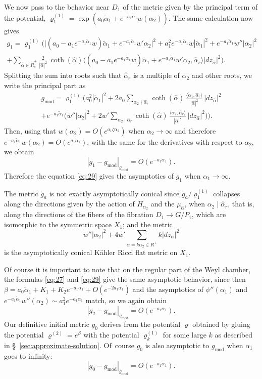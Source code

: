 \documentclass[10pt]{amsart}
\theoremstyle{plain}
\theoremstyle{definition}
\DeclareMathOperator{\mo}{mod}
\newcommand{\ta}{\tilde \alpha}
\newcommand{\ha}{\hat{\alpha}}
\newcommand{\Roots}{\hat{R}}
\newcommand{\rhodeux}{\varrho^{(2)}}
\newcommand{\rhoun}{\varrho^{(1)}}
\begin{document}
We now pass to the behavior near $D_1$ of the metric given by the principal term of the potential, $\rhoun_1=\exp(a_0\ta_1+e^{-a_1\ta_1} w(\alpha_2))$. The same calculation now gives
\begin{multline*}
g_1 = \rhoun_1 \Big( \big|(a_0-a_1e^{-a_1\ta_1}w)\ta_1+e^{-a_1\ta_1} w'\alpha_2\big|^2  + a_1^2e^{-a_1\ta_1} w |\ta_1|^2 + e^{-a_1\ta_1}w'' |\alpha_2|^2 \\
 + \sum_{\ha\in \Roots_s^+} \frac2{|\ha|^2}\, \coth(\ha) \big\langle(a_0-a_1e^{-a_1\ta_1}w)\ta_1+e^{-a_1\ta_1}w'\alpha_2,\ha_r\big\rangle |dz_{\ha}|^2 \Big).
\end{multline*}
Splitting the sum into roots such that $\ha_r$ is a multiple of $\alpha_2$ and other roots, we write the principal part as
\begin{multline}\label{eq:29}
g_{\mo} = \rhoun_1 \biggl( a_0^2|\ta_1|^2 + 2a_0 \sum_{\alpha_2 \nmid \ha_r} \coth(\ha)\, \frac{\langle\ta_1,\ha_r\rangle}{|\ha|^2}\, |dz_{\ha}|^2 \\
+ e^{-a_1\ta_1} \Big( w'' |\alpha_2|^2 + 2w' \sum_{\alpha_2 \mid \ha_r} \coth(\ha)\, \frac{\langle\alpha_2,\ha_r\rangle}{|\ha|^2}\, |dz_{\ha}|^2 \Big) \biggr).
\end{multline}
Then, using that $w(\alpha_2)=O(e^{a_1\zeta\alpha_2})$ when $\alpha_2\to\infty$ and therefore $e^{-a_1\ta_1}w(\alpha_2)=O(e^{a_1\alpha_1})$, with the same for the derivatives with respect to $\alpha_2$, we obtain
\begin{equation}
| g_1 - g_{\mo} |_{g_{\mo}} = O(e^{-a_1\alpha_1}).
\end{equation}
Therefore the equation \eqref{eq:29} gives the asymptotics of $g_1$ when $\alpha_1\to\infty$.

The metric $g_a$ is not exactly asymptotically conical since $g_a/\rhoun_1$ collapses along the directions given by the action of $H_{\alpha_2}$ and the $\mu_{\ha}$, when $\alpha_2\mid\ha_r$, that is, along the directions of the fibers of the fibration $D_1\to G/P_1$, which are isomorphic to the symmetric space $X_1$; and the metric \[ w'' |\alpha_2|^2 + 4w' \sum_{\alpha=k\alpha_2\in R^+} k |dz_\alpha|^2 \] is the asymptotically conical Kähler Ricci flat metric on $X_1$.

Of course it is important to note that on the regular part of the Weyl chamber, the formulas \eqref{eq:27} and \eqref{eq:29} give the same asymptotic behavior, since then $\beta= a_0\ta_1+K_1+K_2e^{-a_1\alpha_1}+O(e^{-2a_1\alpha_1})$ and the asymptotics of $\psi''(\alpha_1)$ and $e^{-a_1\ta_1}w''(\alpha_2)\sim a_1^2e^{-a_1\alpha_1}$ match, so we again obtain
\[ |g_2-g_{\mo}|_{g_{\mo}} = O(e^{-a_1\alpha_1}). \]
Our definitive initial metric $g_0$ derives from the potential $\varrho$ obtained by gluing the potential $\rhodeux=e^\beta$ with the potential $\rhoun_k$ for some large $k$ as described in §~\ref{sec:approximate-solution}. Of~course $g_0$ is also asymptotic to $g_{\mo}$ when $\alpha_1$ goes to infinity:
\[ |g_0-g_{\mo}|_{g_{\mo}} = O(e^{-a_1\alpha_1}). \]
\end{document}

